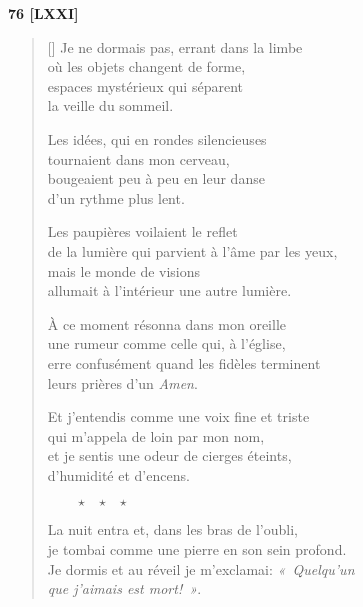 \documentclass[a4paper,12pt]{book}
\begin{document}
\bigskip

\begin{center}
  \textbf{76 [LXXI]}
\end{center}


\begin{verse}[\versewidth]
  Je ne dormais pas, errant dans la limbe \\
  où les objets changent de forme, \\
  espaces mystérieux qui séparent \\
  la veille du sommeil.

  Les idées, qui en rondes silencieuses \\
  tournaient dans mon cerveau, \\
  bougeaient peu à peu en leur danse \\
  d'un rythme plus lent.

  Les paupières voilaient le reflet \\
  de la lumière qui parvient à l'âme par les yeux, \\
  mais le monde de visions \\
  allumait à l'intérieur une autre lumière.

  À ce moment résonna dans mon oreille \\
  une rumeur comme celle qui, à l'église, \\
  erre confusément quand les fidèles terminent \\
  leurs prières d'un \emph{Amen}.

  Et j'entendis comme une voix fine et triste \\
  qui m'appela de loin par mon nom, \\
  et je sentis une odeur de cierges éteints, \\
  d'humidité et d'encens.

  $\ \ \ \ \ \ \ \ \ \star \ \ \ \star \ \ \ \star$

  La nuit entra et, dans les bras de l'oubli, \\
  je tombai comme une pierre en son sein profond. \\
  Je dormis et au réveil je m'exclamai: \emph{«~Quelqu'un \\
que j'aimais est mort!~»}.
\end{verse}

\bigskip
\end{document}
